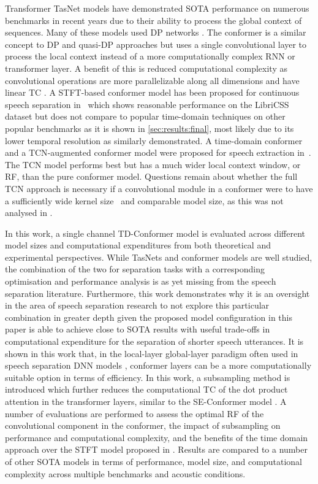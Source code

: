 Transformer \ac{TasNet} models have demonstrated \ac{SOTA} performance on numerous benchmarks in recent years \cite{dptnet, sepformer,tdanet,QDPN} 
due to their ability to process the global context of sequences. Many of these models used \ac{DP} networks \cite{dprnn, dptnet, sepformer}.
The conformer is a similar concept to \ac{DP} and quasi-\ac{DP} approaches \cite{dprnn,sepformer,QDPN}
but uses a single convolutional layer to process the local context instead of a more computationally complex \ac{RNN} or transformer layer. A benefit of this is reduced computational complexity as convolutional operations are more parallelizable along all dimensions and have linear \ac{TC} \cite{atttasnet}. A \ac{STFT}-based conformer model has been proposed for continuous speech separation in~\cite{cssconformer} which shows reasonable performance on the LibriCSS dataset but does not compare to popular time-domain techniques on other popular benchmarks as it is shown in \autoref{sec:results:final}, most likely due to its lower temporal resolution as \cite{IWAENCbestpaper} similarly demonstrated. 
A time-domain conformer and a \ac{TCN}-augmented conformer model were proposed for speech extraction in~\cite{sinhaconformer}.  The \ac{TCN} model performs best but has a much wider local context window, or \ac{RF}, than the pure conformer model. 
Questions remain about whether the full \ac{TCN} approach is necessary if a convolutional module in a conformer were to have a sufficiently wide kernel size~\cite{sinhaconformer, QDPN} and comparable model size, as this was not analysed in \cite{sinhaconformer}.


In this work, a single channel \ac{TD-Conformer} model is evaluated across different model sizes and computational expenditures from both theoretical and experimental perspectives. 
While \acp{TasNet} and conformer models are well studied, the combination of the two for separation tasks with a corresponding optimisation and performance analysis is as yet missing from the speech separation literature. 
Furthermore, this work demonstrates why it is an oversight in the area of speech separation research to not explore this particular combination in greater depth given the proposed model configuration in this paper is able to achieve close to \ac{SOTA} results with useful trade-offs in computational expenditure for the separation of shorter speech utterances.
It is shown in this work that, in the local-layer global-layer paradigm often used in speech separation \ac{DNN} models \cite{dprnn,dptnet,sepformer}, \ac{conformer} layers can be a more computationally suitable option in terms of efficiency.
In this work, a subsampling method is introduced which further reduces the computational \ac{TC} of the dot product attention in the transformer layers, similar to the SE-Conformer model \cite{se_conformer}. A number of evaluations are performed to assess the optimal \ac{RF} \cite{rfield} of the convolutional component in the conformer, the impact of subsampling on performance and computational complexity, and the benefits of the time domain approach over the \ac{STFT} model proposed in \cite{cssconformer}. Results are compared to a number of other \ac{SOTA} models in terms of performance, model size, and computational complexity across multiple benchmarks and acoustic conditions.

